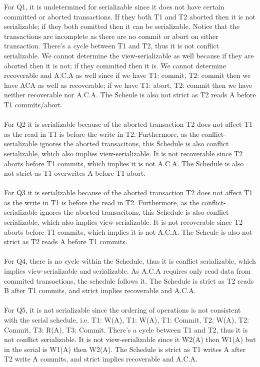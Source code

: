 \documentclass[12pt]{article}
\begin{document}
For Q1, it is undetermined for serializable since it does not have certain committed or aborted transactions. If they both T1 and T2 aborted then it is not serializable; if they both comitted then it can be serializable. Notice that the transactions are incomplete as there are no commit or abort on either transaction. There's a cycle between T1 and T2, thus it is not conflict serializable. We cannot determine the view-serializable as well because if they are aborted then it is not; if they commited then it is. We cannot determine recoverable and A.C.A as well since if we have T1: commit, T2: commit then we have ACA as well as recoverable; if we have T1: abort, T2: commit then we have neither recoverable nor A.C.A. The Scheule is also not strict as T2 reads A before T1 commits/abort. \\
\\
For Q2 it is serializable because of the aborted transaction T2 does not affect T1 as the read in T1 is before the write in T2. Furthermore, as the conflict-serializable ignores the aborted transacitons, this Schedule is also conflict serializable, which also implies view-serializable. It is not recoverable since T2 aborts before T1 commits, which implies it is not A.C.A. The Schedule is also not strict as T1 overwrites A before T1 abort.\\
\\
For Q3 it is serializable because of the aborted transaction T2 does not affect T1 as the write in T1 is before the read in T2. Furthermore, as the conflict-serializable ignores the aborted transacitons, this Schedule is also conflict serializable, which also implies view-serializable. It is not recoverable since T2 aborts before T1 commits, which implies it is not A.C.A. The Scheule is also not strict as T2 reads A before T1 commits.\\
\\
For Q4, there is no cycle within the Schedule, thus it is conflict serializable, which implies view-serializable and serializable. As A.C.A requires only read data from commited transactions, the schedule follows it.  The Schedule is strict as T2 reads B after T1 commits, and strict implies recoverable and A.C.A. \\
\\
For Q5, it is not serializable since the ordering of operations is not consistent with the serial schedule, i.e. T1: W(A), T1: W(A), T1: Commit, T2: W(A), T2: Commit, T3: R(A), T3: Commit. There's a cycle between T1 and T2, thus it is not conflict serializable. It is not view-serializable since it W2(A) then W1(A) but in the serial is W1(A) then W2(A). The Schedule is strict as T1 writes A after T2 write A commits, and strict implies recoverable and A.C.A. \\
\end{document}
